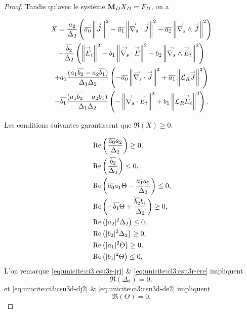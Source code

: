 \begin{proof}
      {Tandis qu'avec le système \(\mathbf{M}_DX_D=F_D\)}, on a

      \begin{multline*}
        X =
        \dfrac{a_2}{\Delta_2}
        \left(
        {\overline{a_0}} \left\lVert{\overset{\rightarrow}{J}}\right\rVert^2 - {\overline{a_1}} \left\lVert{\overset{\rightarrow}{\nabla_s}} \cdot {\overset{\rightarrow}{J}}\right\rVert^2 - {\overline{a_2}} \left\lVert{\overset{\rightarrow}{\nabla_s}} \wedge {\overset{\rightarrow}{J}}\right\rVert^2 
        \right)
        \\
        -\dfrac{{\overline{b_2}}}{\Delta_2}
        \left(
        \left\lVert{\overset{\rightarrow}{E}}_t\right\rVert^2   - b_1 \left\lVert{\overset{\rightarrow}{\nabla_s}} \cdot {\overset{\rightarrow}{E}} \right\rVert^2  - b_2 \left\lVert{\overset{\rightarrow}{\nabla_s}} \wedge {\overset{\rightarrow}{E}}_t\right\rVert^2
        \right)
        \\
        + a_1\dfrac{(a_1{\overline{b_2}}-a_2{\overline{b_1}})}{\Delta_1\Delta_2}
        \left(
        -{\overline{a_0}} \left\lVert{\overset{\rightarrow}{\nabla_s}} \cdot {\overset{\rightarrow}{J}}\right\rVert^2 + {\overline{a_1}} \left\lVert{\mathcal{L}_R} {\overset{\rightarrow}{J}}\right\rVert^2
        \right)
        \\
        -{\overline{b_1}}\dfrac{(a_1{\overline{b_2}}-a_2{\overline{b_1}})}{\Delta_1\Delta_2}
        \left(
        -\left\lVert{\overset{\rightarrow}{\nabla_s}} \cdot {\overset{\rightarrow}{E}}_t\right\rVert^2   + {b_1} \left\lVert{\mathcal{L}_R} {\overset{\rightarrow}{E}}_t\right\rVert^2
        \right).
      \end{multline*}
 
      Les conditions suivantes garantissent que \(\Re(X)\ge 0\).

      \begin{align}
        \label{eq:unicite:ci3:csu3r-j2}&\operatorname{Re}\left(\dfrac{{\overline{a_0}}{a_2}}{\Delta_2}\right) \ge 0,
        \\
        \label{eq:unicite:ci3:csu3r-e2}&\operatorname{Re}\left(\dfrac{{\overline{b_2}}}{\Delta_2}\right) \le 0,
        \\
        \label{eq:unicite:ci3:csu3r-jdj}&\operatorname{Re}\left({\overline{a_0}}a_1\Theta - \dfrac{{\overline{a_1}}a_2}{\Delta_2} \right)\le 0,
        \\
        \label{eq:unicite:ci3:csu3r-ede}&\operatorname{Re}\left(-{\overline{b_1}}\Theta + \dfrac{{\overline{b_2}}b_1}{\Delta_2} \right) \ge 0,
        \\
        \label{eq:unicite:ci3:csu3r-jrj}&\operatorname{Re}\left(|a_2|^2\Delta_2\right) \le 0,
        \\
        \label{eq:unicite:ci3:csu3r-ere}&\operatorname{Re}\left(|b_2|^2\Delta_2\right) \ge 0,
        \\
        \label{eq:unicite:ci3:csu3r-rj2}&\operatorname{Re}\left(|a_1|^2\Theta\right)\ge 0,
        \\
        \label{eq:unicite:ci3:csu3r-re2}&\operatorname{Re}\left(|b_1|^2\Theta\right)\le 0,
      \end{align}
      L'on remarque \eqref{eq:unicite:ci3:csu3r-jrj} \& \eqref{eq:unicite:ci3:csu3r-ere} impliquent
      \begin{equation}
        \label{eq:unicite:ci3:csu3r-jre}
        \Re\left(\Delta_2\right) = 0,
      \end{equation}
      et \eqref{eq:unicite:ci3:csu3d-dj2} \& \eqref{eq:unicite:ci3:csu3d-de2} impliquent
      \begin{equation}
        \label{eq:unicite:ci3:csu3-dje2}
        \Re\left(\Theta\right) = 0.
      \end{equation}


\end{proof}
